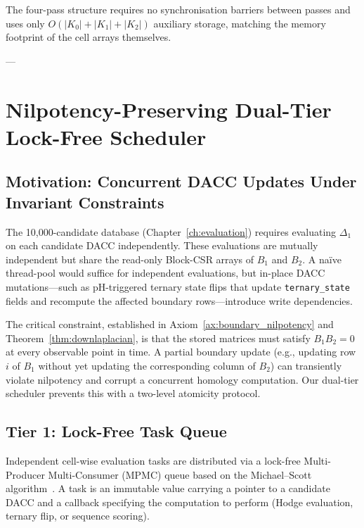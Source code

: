 The four-pass structure requires no synchronisation barriers between passes
and uses only $O(|K_0| + |K_1| + |K_2|)$ auxiliary storage, matching the
memory footprint of the cell arrays themselves.

---

\section{Nil\-po\-ten\-cy-Preserving Dual-Tier Lock-Free Scheduler}
\label{sec:concurrency}

\subsection{Motivation: Concurrent DACC Updates Under Invariant Constraints}
\label{subsec:concurrency_motivation}

The 10,000-candidate database (Chapter~\ref{ch:evaluation}) requires
evaluating $\Delta_1$ on each candidate DACC independently.  These
evaluations are mutually independent but share the read-only Block-CSR
arrays of $B_1$ and $B_2$.  A naïve thread-pool would suffice for
independent evaluations, but in-place DACC mutations---such as pH-triggered
ternary state flips that update \texttt{ternary\_state} fields and
recompute the affected boundary rows---introduce write dependencies.

The critical constraint, established in Axiom~\ref{ax:boundary_nilpotency}
and Theorem~\ref{thm:downlaplacian}, is that the stored matrices must
satisfy $B_1 B_2 = 0$ at every observable point in time.  A partial
boundary update (e.g., updating row $i$ of $B_1$ without yet updating the
corresponding column of $B_2$) can transiently violate nilpotency and
corrupt a concurrent homology computation.  Our dual-tier scheduler
prevents this with a two-level atomicity protocol.

\subsection{Tier 1: Lock-Free Task Queue}
\label{subsec:tier1}

Independent cell-wise evaluation tasks are distributed via a lock-free
Multi-Producer Multi-Consumer (MPMC) queue based on the Michael--Scott
algorithm~\cite{michael1996simple}.  A task is an immutable value carrying
a pointer to a candidate DACC and a callback specifying the computation to
perform (Hodge evaluation, ternary flip, or sequence scoring).

